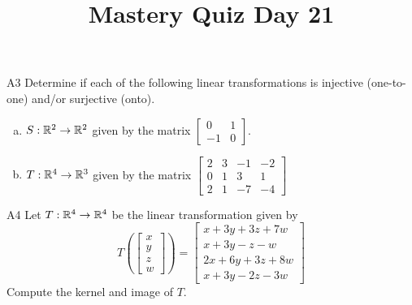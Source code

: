 \documentclass{sbgLAquiz}
\title{Mastery Quiz Day 21 }
\begin{document}
\begin{problem}{A3}
Determine if each of the following linear transformations is injective (one-to-one) and/or surjective (onto).
\begin{enumerate}[(a)]
\item $S: \mathbb{R}^2 \rightarrow \mathbb{R}^2$ given by the matrix $\begin{bmatrix} 0 & 1 \\ -1 & 0 \end{bmatrix}$.
\item $T: \mathbb{R}^4 \rightarrow \mathbb{R}^3$ given by the matrix $\begin{bmatrix} 2 & 3 & -1 & -2 \\ 0 & 1 & 3 & 1 \\ 2 & 1 & -7 & -4 \end{bmatrix}$
\end{enumerate}
\end{problem}

\begin{problem}{A4}
Let $T: \mathbb{R}^4\rightarrow \mathbb{R}^4$ be the linear transformation given by $$T\left(\begin{bmatrix} x \\ y \\ z \\ w \end{bmatrix} \right) = \begin{bmatrix} x+3y+3z+7w \\ x+3y-z-w \\ 2x+6y+3z+8w \\ x+3y-2z-3w \end{bmatrix}$$
Compute the kernel and image of $T$.
\end{problem}
\end{document}
